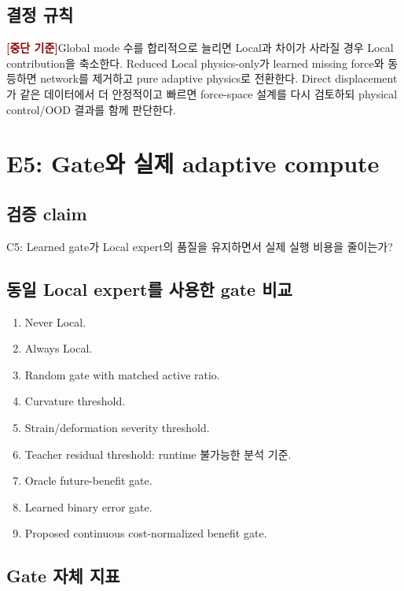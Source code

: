 \documentclass[11pt,a4paper]{article}
\newcommand{\killgate}{\textcolor{darkred}{\textbf{[중단 기준]}}}
\begin{document}
\subsection*{결정 규칙}

\killgate Global mode 수를 합리적으로 늘리면 Local과 차이가 사라질 경우
Local contribution을 축소한다.
Reduced Local physics-only가 learned missing force와 동등하면 network를 제거하고
pure adaptive physics로 전환한다.
Direct displacement가 같은 데이터에서 더 안정적이고 빠르면
force-space 설계를 다시 검토하되 physical control/OOD 결과를 함께 판단한다.

\section{E5: Gate와 실제 adaptive compute}

\subsection*{검증 claim}

C5: Learned gate가 Local expert의 품질을 유지하면서 실제 실행 비용을 줄이는가?

\subsection*{동일 Local expert를 사용한 gate 비교}

\begin{enumerate}[leftmargin=1.7em]
  \item Never Local.
  \item Always Local.
  \item Random gate with matched active ratio.
  \item Curvature threshold.
  \item Strain/deformation severity threshold.
  \item Teacher residual threshold: runtime 불가능한 분석 기준.
  \item Oracle future-benefit gate.
  \item Learned binary error gate.
  \item Proposed continuous cost-normalized benefit gate.
\end{enumerate}

\subsection*{Gate 자체 지표}
\end{document}
